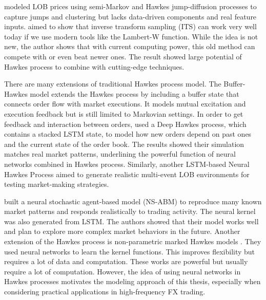 \cite{lalor_algorithmic_2025} modeled LOB prices using semi-Markov and Hawkes jump-diffusion processes to capture jumps and clustering but lacks data-driven components and real feature inputs. \cite{magris_simulation_nodate} aimed to show that inverse transform sampling (ITS) can work very well today if we use modern tools like the Lambert-W function. While the idea is not new, the author shows that with current computing power, this old method can compete with or even beat newer ones. The result showed large potential of Hawkes process to combine with cutting-edge techniques.


There are many extensions of traditional Hawkes process model. The Buffer-Hawkes model \citep{kaj_buffer_2017} extends the Hawkes process by including a buffer state that connects order flow with market executions. It models mutual excitation and execution feedback but is still limited to Markovian settings. In order to get feedback and interaction between orders, \cite{kumar2021deephawkesprocesshighfrequency} used a Deep Hawkes process, which contains a stacked LSTM state, to model how new orders depend on past ones and the current state of the order book. The results showed their simulation matches real market patterns, underlining the powerful function of neural networks combined in Hawkes process. Similarly, another LSTM-based Neural Hawkes Process \citep{lalor_event-based_2025} aimed to generate realistic multi-event LOB environments for testing market-making strategies. 

\cite{shi_neural_2023} built a neural stochastic agent-based model (NS-ABM) to reproduce many known market patterns and responds realistically to trading activity. The neural kernel was also generated from LSTM. The authors showed that their model works well and plan to explore more complex market behaviors in the future. Another extension of the Hawkes process is non-parametric marked Hawkes models \citep{joseph_non-parametric_2024}. They used neural networks to learn the kernel functions. This improves flexibility but requires a lot of data and computation. These works are powerful but usually require a lot of computation. However, the idea of using neural networks in Hawkes processes motivates the modeling approach of this thesis, especially when considering practical applications in high-frequency FX trading.

